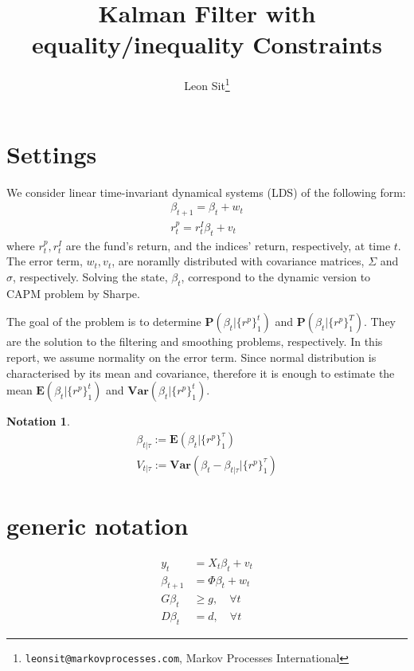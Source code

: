 \documentclass{article}
\title{Kalman Filter with equality/inequality Constraints}
\author{Leon Sit\footnote{\texttt{leonsit@markovprocesses.com}, Markov Processes International}}
\theoremstyle{plain}
\theoremstyle{definition}
\newtheorem{notation}[thm]{Notation}\small
\theoremstyle{remark}
\newcommand{\E}{\mathbf{E}}
\newcommand{\Var}{\mathbf{Var}}
\newcommand{\PP}{\mathbf{P}}
\begin{document}
\renewcommand{\baselinestretch}{1.5}

\maketitle
\tableofcontents
\listofalgorithms
\section{Settings}
We consider linear time-invariant dynamical systems (LDS) of the following form:
\begin{eqnarray}
\beta_{t+1} =  \beta_{t} + w_t\\
r^p_t = r^I_t \beta_t + v_t
\label{lds}
\end{eqnarray}
where $r^p_t, r^I_t$ are the fund's return, and the indices' return, respectively, at time $t$. The error term, $w_t, v_t$, are noramlly distributed with covariance matrices, $\Sigma$ and $\sigma$, respectively. Solving the state, $\beta_t$, correspond to the dynamic version to CAPM problem by Sharpe. 

The goal of the problem is to determine $\PP(\beta_t | \{ r^p\}_1^{t})$ and $\PP(\beta_t | \{ r^p\}_1^{T})$. They are the solution to the filtering and smoothing problems, respectively. In this report, we assume normality on the error term. Since normal distribution is characterised by its mean and covariance, therefore it is enough to estimate the mean $\E(\beta_t | \{ r^p\}_1^{t})$ and $\Var(\beta_t | \{ r^p\}_1^{t})$.

\begin{notation}
\begin{eqnarray*}
\beta_{t|\tau} := \E(\beta_t | \{ r^p \} ^ \tau _ 1 )\\
V_{t|\tau} := \Var(\beta_t - \beta_{t|\tau} | \{ r^p \} ^ \tau _ 1 ) 
\end{eqnarray*}
\end{notation}


\section{generic notation}
\begin{equation}
\begin{split}
y_t &= X_t \beta_t + v_t\\
\beta_{t+1} &= \Phi \beta_{t} + w_t\\
G \beta_t &\geq g, \quad \forall t\\
D \beta_t &= d, \quad \forall t
\end{split}
\end{equation}
\end{document}
